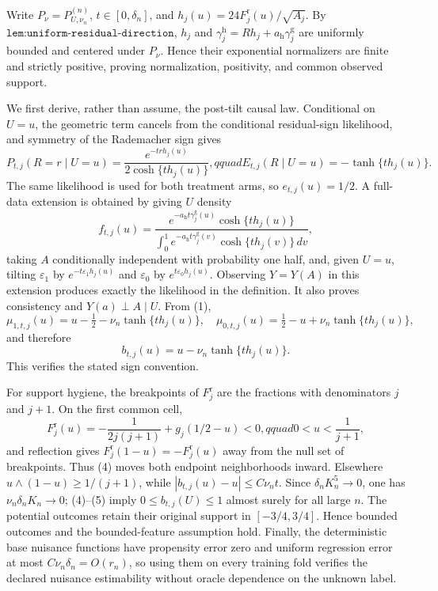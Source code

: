 Write \(P_\nu=P_{U,\nu_n}^{(n)}\), \(t\in[0,\delta_n]\), and \(h_j(u)=24F_j^{\mathrm r}(u)/\sqrt{A_j}\).  By \(\texttt{lem:uniform-residual-direction}\), \(h_j\) and \(\gamma_j^{\mathrm h}=Rh_j+a_{\mathrm h}\gamma_j^{\mathrm g}\) are uniformly bounded and centered under \(P_\nu\).  Hence their exponential normalizers are finite and strictly positive, proving normalization, positivity, and common observed support.

We first derive, rather than assume, the post-tilt causal law.  Conditional on \(U=u\), the geometric term cancels from the conditional residual-sign likelihood, and symmetry of the Rademacher sign gives
\[
 P_{t,j}(R=r\mid U=u)=\frac{e^{-trh_j(u)}}{2\cosh\{th_j(u)\}},qquad
 E_{t,j}(R\mid U=u)=-\tanh\{th_j(u)\}.                                  \tag{1}
\]
The same likelihood is used for both treatment arms, so \(e_{t,j}(u)=1/2\).  A full-data extension is obtained by giving \(U\) density
\[
 f_{t,j}(u)=\frac{e^{-a_{\mathrm h}t\gamma_j^{\mathrm g}(u)}
 \cosh\{th_j(u)\}}
 {\int_0^1e^{-a_{\mathrm h}t\gamma_j^{\mathrm g}(v)}\cosh\{th_j(v)\}\,dv},             \tag{2}
\]
taking \(A\) conditionally independent with probability one half, and, given \(U=u\), tilting \(\varepsilon_1\) by \(e^{-t\varepsilon_1h_j(u)}\) and \(\varepsilon_0\) by \(e^{t\varepsilon_0h_j(u)}\).  Observing \(Y=Y(A)\) in this extension produces exactly the likelihood in the definition.  It also proves consistency and \(Y(a)\perp A\mid U\).  From (1),
\[
 \mu_{1,t,j}(u)=u-\tfrac12-\nu_n\tanh\{th_j(u)\},\quad
 \mu_{0,t,j}(u)=\tfrac12-u+\nu_n\tanh\{th_j(u)\},                         \tag{3}
\]
and therefore
\[
 b_{t,j}(u)=u-\nu_n\tanh\{th_j(u)\}.                                    \tag{4}
\]
This verifies the stated sign convention.

For support hygiene, the breakpoints of \(F_j^{\mathrm r}\) are the fractions with denominators \(j\) and \(j+1\).  On the first common cell,
\[
 F_j^{\mathrm r}(u)=-\frac1{2j(j+1)}+g_j(1/2-u)<0,qquad
 0<u<\frac1{j+1},                                                         \tag{5}
\]
and reflection gives \(F_j^{\mathrm r}(1-u)=-F_j^{\mathrm r}(u)\) away from the null set of breakpoints.  Thus (4) moves both endpoint neighborhoods inward.  Elsewhere \(u\wedge(1-u)\geq1/(j+1)\), while \(|b_{t,j}(u)-u|\leq C\nu_nt\).  Since \(\delta_nK_n^5\to0\), one has \(\nu_n\delta_nK_n\to0\); (4)--(5) imply \(0\leq b_{t,j}(U)\leq1\) almost surely for all large \(n\).  The potential outcomes retain their original support in \([-3/4,3/4]\).  Hence bounded outcomes and the bounded-feature assumption hold.  Finally, the deterministic base nuisance functions have propensity error zero and uniform regression error at most \(C\nu_n\delta_n=O(r_n)\), so using them on every training fold verifies the declared nuisance estimability without oracle dependence on the unknown label.

